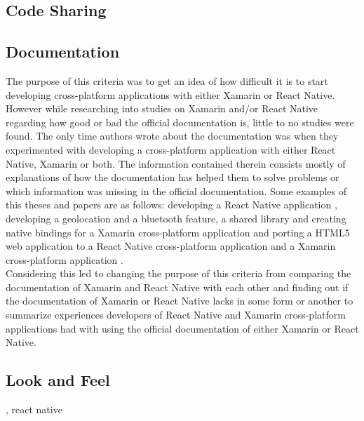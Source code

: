 \documentclass[Bachelor,BIF,english]{twbook}
\begin{document}
\subsection{Code Sharing}
\cite[p.~31]{Hansson_Vidhall_2016}

\subsection{Documentation}
The purpose of this criteria was to get an idea of how difficult it is to start developing cross-platform applications with either Xamarin or React Native. However while researching into studies on Xamarin and/or React Native regarding how good or bad the official documentation is, little to no studies were found. The only time authors wrote about the documentation was when they experimented with developing a cross-platform application with either React Native, Xamarin or both. The information contained therein consists mostly of explanations of how the documentation has helped them to solve problems or which information was missing in the official documentation. Some examples of this theses and papers are as follows: developing a React Native application \cite[p.~16-18]{Danielsson_2016}, developing a geolocation and a bluetooth feature, a shared library and creating native bindings for a Xamarin cross-platform application \cite[p.~10-15]{Dickson_2013} and porting a HTML5 web application to a React Native cross-platform application and a Xamarin cross-platform application \cite[p.~33-69]{ZubaBernhard2017EdPb}.
\\[\baselineskip]
Considering this led to changing the purpose of this criteria from comparing the documentation of Xamarin and React Native with each other and finding out if the documentation of Xamarin or React Native lacks in some form or another to summarize experiences developers of React Native and Xamarin cross-platform applications had with using the official documentation of either Xamarin or React Native. 

\subsection{Look and Feel}
\cite[p.~18]{GaouarBenamarBendimerad2016}, react native \cite[p.~25]{Danielsson_2016} \cite[p.~31]{Hansson_Vidhall_2016}
\end{document}
